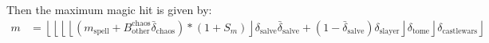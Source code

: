 	Then the maximum magic hit is given by:
	\begin{align}
		m &= \left \lfloor\left \lfloor\left \lfloor\left \lfloor (m_\text{spell} + B_\text{other}^\text{chaos}\bar\delta_\text{chaos}) * (1 + S_m) \right \rfloor \delta_\text{salve}\bar\delta_\text{salve} + (1 - \bar\delta_\text{salve})\delta_\text{slayer}\right \rfloor \delta_\text{tome}\right \rfloor \delta_\text{castlewars}\right \rfloor
	\end{align}
